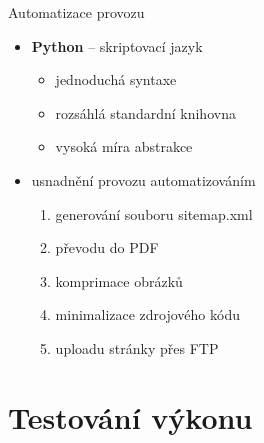 \documentclass[14pt, hyperref={unicode}]{beamer}
\begin{document}
  \begin{frame}{Automatizace provozu}
    \begin{itemize}[<+->]
      \item \textbf{Python} -- skriptovací jazyk
      \begin{itemize}
        \item jednoduchá syntaxe
        \item rozsáhlá standardní knihovna
        \item vysoká míra abstrakce
      \end{itemize}
    \end{itemize}

    \begin{itemize}
      \item<+-> usnadnění provozu automatizováním
      \begin{enumerate}[<+->]
        \item generování souboru sitemap.xml
        \item převodu do PDF
        \item komprimace obrázků
        \item minimalizace zdrojového kódu
        \item uploadu stránky přes FTP
      \end{enumerate}
    \end{itemize}
  \end{frame}

  \section{Testování výkonu}
\end{document}
